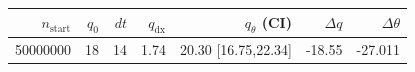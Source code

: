 \begin{tabular}{r r r r r r r}
\hline
$n_{\mathrm{start}}$ & $q_0$ & $dt$ & $q_{\mathrm{dx}}$ & $q_{\theta}$ (CI) & $\Delta q$ & $\Delta\theta$ \\
\hline
50000000 & 18 & 14 & 1.74 & 20.30 [16.75,22.34] & -18.55 & -27.011 \\
\hline
\end{tabular}
